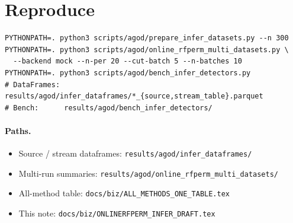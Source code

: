 \documentclass[11pt]{article}
\begin{document}
\section{Reproduce}
\begin{verbatim}
PYTHONPATH=. python3 scripts/agod/prepare_infer_datasets.py --n 300
PYTHONPATH=. python3 scripts/agod/online_rfperm_multi_datasets.py \
  --backend mock --n-per 20 --cut-batch 5 --n-batches 10
PYTHONPATH=. python3 scripts/agod/bench_infer_detectors.py
# DataFrames: results/agod/infer_dataframes/*_{source,stream_table}.parquet
# Bench:      results/agod/bench_infer_detectors/
\end{verbatim}

\paragraph{Paths.}
\begin{itemize}[leftmargin=1.2em]
\item Source / stream dataframes:
\texttt{results/agod/infer\_dataframes/}
\item Multi-run summaries:
\texttt{results/agod/online\_rfperm\_multi\_datasets/}
\item All-method table:
\texttt{docs/biz/ALL\_METHODS\_ONE\_TABLE.tex}
\item This note:
\texttt{docs/biz/ONLINERFPERM\_INFER\_DRAFT.tex}
\end{itemize}
\end{document}
